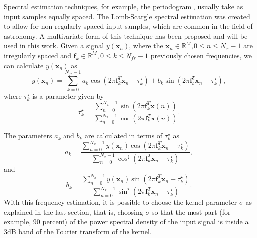 Spectral estimation techniques, for example, the periodogram \cite{kay_modern_1988}, usually take as input samples equally spaced. The Lomb-Scargle spectral estimation \cite{scargle_studies_1982} was created to allow for non-regularly spaced input samples, which are common in the field of astronomy. A multivariate form of this technique has been proposed \cite{seilmayer_multivariate_2020} and will be used in this work. Given a signal $y(\mathbf{x}_n)$, where the $\mathbf{x}_n \in \mathbb{R}^M, 0 \leq n \leq N_x - 1$ are irregularly spaced and $\mathbf{f}_k \in \mathbb{R}^M, 0 \leq k \leq N_{fr} -1$ previously chosen frequencies, we can calculate $y(\mathbf{x}_n)$ as
\begin{equation}
    y(\mathbf{x}_n) = \sum_{k=0}^{N_{fr}-1} a_k \cos(2\pi \mathbf{f}^T_k\mathbf{x}_n - \tau_k^{\star}) + b_k \sin(2\pi \mathbf{f}^T_k\mathbf{x}_n - \tau_k^{\star}),
\end{equation}
where $\tau_k^{\star}$ is a parameter given by
\begin{equation}
    \tau_k^{\star} = \frac{\sum_{n=0}^{N_x-1} \sin(2\pi \mathbf{f}_k^T\mathbf{x}(n))}{\sum_{n=0}^{N_x-1} \cos(2\pi \mathbf{f}_k^T\mathbf{x}(n))}.
\end{equation}

The parameters $a_k$ and $b_k$ are calculated in terms of $\tau_k^{\star}$ as 
\begin{equation}
    a_k = \frac{\sum_{n=0}^{N_x-1} y(\mathbf{x}_n)\cos(2\pi \mathbf{f}_k^T\mathbf{x}_n - \tau_k^{\star})}{\sum_{n=0}^{N_x-1} \cos^2(2\pi \mathbf{f}_k^T\mathbf{x}_n - \tau_k^{\star})},
\end{equation}
and
\begin{equation}
    b_k = \frac{\sum_{n=0}^{N_x-1} y(\mathbf{x}_n)\sin(2\pi \mathbf{f}_k^T\mathbf{x}_n - \tau_k^{\star})}{\sum_{n=0}^{N_x-1} \sin^2(2\pi \mathbf{f}_k^T\mathbf{x}_n - \tau_k^{\star})}.
\end{equation}
With this frequency estimation, it is possible to choose the kernel parameter $\sigma$ as explained in the last section, that is, choosing $\sigma$ so that the most part (for example, 90 percent) of the power spectral density of the input signal is inside a 3dB band of the Fourier transform of the kernel.

